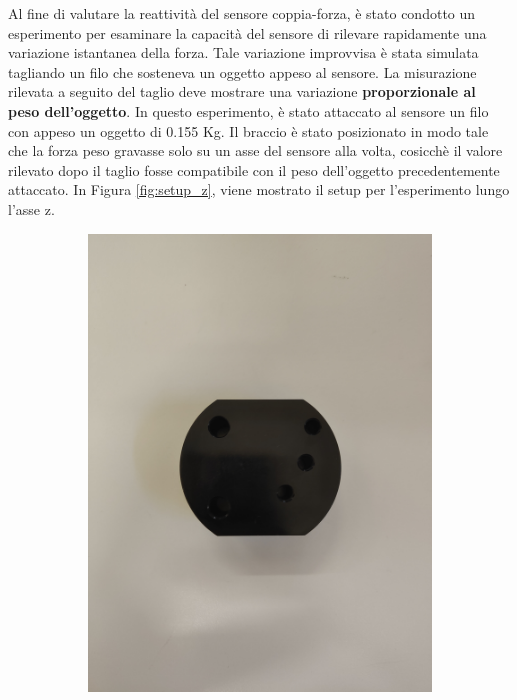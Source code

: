 Al fine di valutare la reattivit\`{a} del sensore coppia-forza, \`{e} stato condotto un esperimento per esaminare la capacit\`{a} del 
sensore di rilevare rapidamente una variazione istantanea della forza. 
Tale variazione improvvisa \`{e} stata simulata 
tagliando un filo che sosteneva un oggetto appeso al sensore. La misurazione rilevata a seguito del taglio  
deve mostrare una variazione \textbf{proporzionale al peso dell'oggetto}.
In questo esperimento, \`{e} stato attaccato al sensore un filo con appeso un oggetto di 0.155 Kg. 
Il braccio \`{e} stato posizionato in modo tale che la forza peso gravasse solo su un asse del sensore alla volta, cosicch\`{e} 
il valore rilevato dopo il taglio fosse compatibile con il peso dell'oggetto precedentemente attaccato. 
In Figura \ref{fig:setup_z}, viene mostrato il setup per l'esperimento lungo l'asse z. 
\begin{figure}[H]
    \centering
    \begin{subfigure}[b]{0.4\textwidth}
        \includegraphics[width=\textwidth]{images/object.jpg}

\end{subfigure}
\end{figure}
